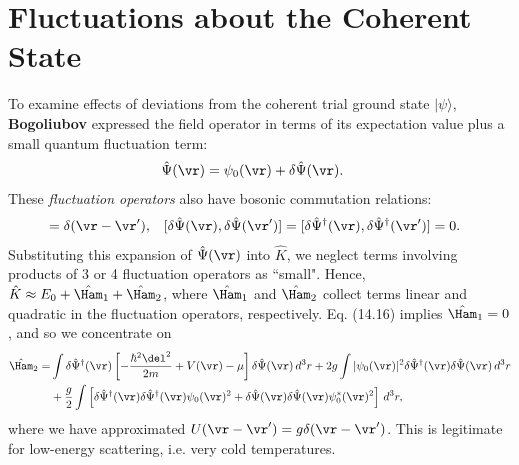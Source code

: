 \documentclass[qo.tex]{subfiles}
\begin{document}
\section{Fluctuations about the Coherent State}
To examine effects of deviations from the coherent trial ground state $|\psi\rangle$, \textbf{Bogoliubov} expressed the field operator in terms of its expectation value plus a small quantum fluctuation term:
\begin{align}
    \hat{\Psi}(\vr) &= \psi_0(\vr) + \delta\hat{\Psi}(\vr).
\end{align}
These \emph{fluctuation operators} also have bosonic commutation relations:
\begin{align}
    [\delta\hat{\Psi}(\vr),\delta\hat{\Psi}^\dagger(\vr')] &= \delta(\vr-\vr'), & [\delta\hat{\Psi}(\vr),\delta\hat{\Psi}(\vr')] &= [\delta\hat{\Psi}^\dagger(\vr),\delta\hat{\Psi}^\dagger(\vr')] = 0.
\end{align}
Substituting this expansion of $\hat{\Psi}(\vr)$ into $\hat{K}$, we neglect terms involving products of 3 or 4 fluctuation operators as ``small".
Hence, $\hat{K}\approx E_0+\hat{\Ham}_1+\hat{\Ham}_2$, where $\hat{\Ham}_1$ and $\hat{\Ham}_2$ collect terms linear and quadratic in the fluctuation operators, respectively. 
Eq. (14.16) implies $\hat{\Ham}_1=0$, and so we concentrate on
\begin{align}
    \begin{split}
        \hat{\Ham}_2 = &\int \delta\hat{\Psi}^\dagger(\vr)\left[-\frac{\hbar^2\del^2}{2m}+V(\vr)-\mu\right]\delta\hat{\Psi}(\vr)\,d^3r + 2g\int |\psi_0(\vr)|^2\delta\hat{\Psi}^\dagger(\vr)\delta\hat{\Psi}(\vr)\,d^3r \\
                       &+\frac{g}{2}\int \left[\delta\hat{\Psi}^\dagger(\vr)\delta\hat{\Psi}^\dagger(\vr)\psi_0(\vr)^2 + \delta\hat{\Psi}(\vr)\delta\hat{\Psi}(\vr)\psi_0^*(\vr)^2\right]\,d^3r,
    \end{split}
\end{align}
where we have approximated $U(\vr-\vr')=g\delta(\vr-\vr')$.
This is legitimate for low-energy scattering, i.e. very cold temperatures.
\end{document}
